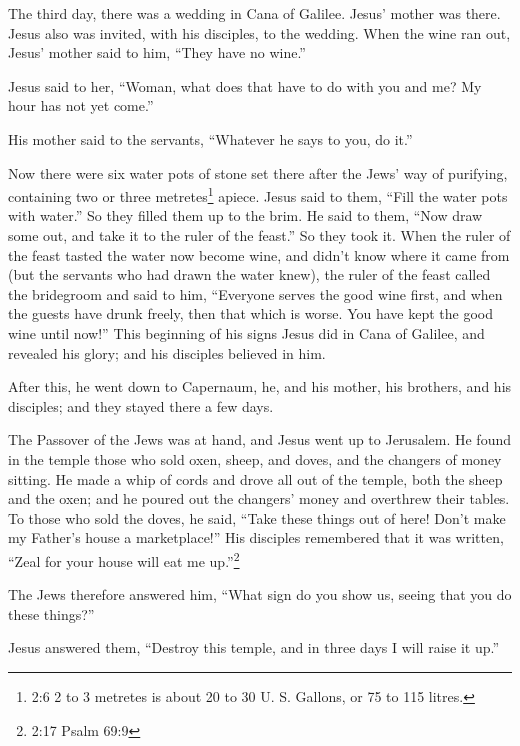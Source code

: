  The third day, there was a wedding in Cana of Galilee.
Jesus' mother was there.  Jesus also was invited, with his
disciples, to the wedding.  When the wine ran out, Jesus'
mother said to him, ``They have no wine.''

 Jesus said to her, ``Woman, what does that have to do with
you and me? My hour has not yet come.''

 His mother said to the servants, ``Whatever he says to you,
do it.''

 Now there were six water pots of stone set there after the
Jews' way of purifying, containing two or three metretes\footnote{2:6 2
  to 3 metretes is about 20 to 30 U. S. Gallons, or 75 to 115 litres.}
apiece.  Jesus said to them, ``Fill the water pots with
water.'' So they filled them up to the brim.  He said to
them, ``Now draw some out, and take it to the ruler of the feast.'' So
they took it.  When the ruler of the feast tasted the water
now become wine, and didn't know where it came from (but the servants
who had drawn the water knew), the ruler of the feast called the
bridegroom  and said to him, ``Everyone serves the good
wine first, and when the guests have drunk freely, then that which is
worse. You have kept the good wine until now!''  This
beginning of his signs Jesus did in Cana of Galilee, and revealed his
glory; and his disciples believed in him.

 After this, he went down to Capernaum, he, and his mother,
his brothers, and his disciples; and they stayed there a few days.

 The Passover of the Jews was at hand, and Jesus went up to
Jerusalem.  He found in the temple those who sold oxen,
sheep, and doves, and the changers of money sitting.  He
made a whip of cords and drove all out of the temple, both the sheep and
the oxen; and he poured out the changers' money and overthrew their
tables.  To those who sold the doves, he said, ``Take these
things out of here! Don't make my Father's house a marketplace!''
 His disciples remembered that it was written, ``Zeal for
your house will eat me up.''\footnote{2:17 Psalm 69:9}

 The Jews therefore answered him, ``What sign do you show
us, seeing that you do these things?''

 Jesus answered them, ``Destroy this temple, and in three
days I will raise it up.''

